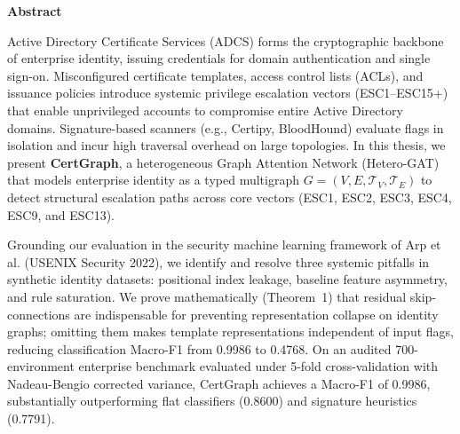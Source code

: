 \thispagestyle{plain}
\begin{center}
    {\fontsize{18pt}{22pt}\selectfont \textbf{Abstract} \par}
\end{center}

\vspace{0.3cm}
\noindent Active Directory Certificate Services (ADCS) forms the cryptographic backbone of enterprise identity, issuing credentials for domain authentication and single sign-on. Misconfigured certificate templates, access control lists (ACLs), and issuance policies introduce systemic privilege escalation vectors (ESC1--ESC15+) that enable unprivileged accounts to compromise entire Active Directory domains. Signature-based scanners (e.g., Certipy, BloodHound) evaluate flags in isolation and incur high traversal overhead on large topologies. In this thesis, we present \textbf{CertGraph}, a heterogeneous Graph Attention Network (Hetero-GAT) that models enterprise identity as a typed multigraph $G = (V, E, \mathcal{T}_V, \mathcal{T}_E)$ to detect structural escalation paths across core vectors (ESC1, ESC2, ESC3, ESC4, ESC9, and ESC13).

Grounding our evaluation in the security machine learning framework of Arp et al. (USENIX Security 2022), we identify and resolve three systemic pitfalls in synthetic identity datasets: positional index leakage, baseline feature asymmetry, and rule saturation. We prove mathematically (Theorem~1) that residual skip-connections are indispensable for preventing representation collapse on identity graphs; omitting them makes template representations independent of input flags, reducing classification Macro-F1 from 0.9986 to 0.4768. On an audited 700-environment enterprise benchmark evaluated under 5-fold cross-validation with Nadeau-Bengio corrected variance, CertGraph achieves a Macro-F1 of 0.9986, substantially outperforming flat classifiers (0.8600) and signature heuristics (0.7791).


